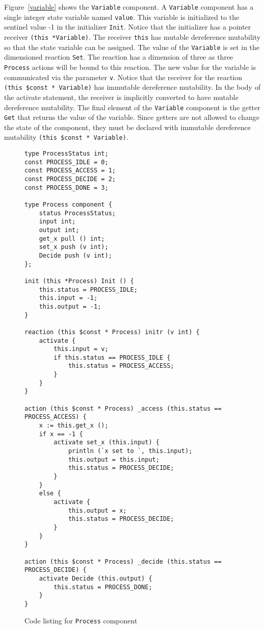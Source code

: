 Figure~\ref{variable} shows the \verb+Variable+ component.
A \verb+Variable+ component has a single integer state variable named \verb+value+.
This variable is initialized to the sentinel value -1 in the initializer \verb+Init+.
Notice that the initializer has a pointer receiver \verb+(this *Variable)+.
The receiver \verb+this+ has mutable dereference mutability so that the state variable can be assigned.
The value of the \verb+Variable+ is set in the dimensioned reaction \verb+Set+.
The reaction has a dimension of three as three \verb+Process+ actions will be bound to this reaction.
The new value for the variable is communicated via the parameter \verb+v+.
Notice that the receiver for the reaction \verb+(this $const * Variable)+ has immutable dereference mutability.
In the body of the activate statement, the receiver is implicitly converted to have mutable dereference mutability.
The final element of the \verb+Variable+ component is the getter \verb+Get+ that returns the value of the variable.
Since getters are not allowed to change the state of the component, they must be declared with immutable dereference mutability \verb+(this $const * Variable)+.

\begin{figure}
\begingroup
\fontsize{9pt}{11pt}\selectfont
\begin{verbatim}
type ProcessStatus int;
const PROCESS_IDLE = 0;
const PROCESS_ACCESS = 1;
const PROCESS_DECIDE = 2;
const PROCESS_DONE = 3;

type Process component {
    status ProcessStatus;
    input int;
    output int;
    get_x pull () int;
    set_x push (v int);
    Decide push (v int);
};

init (this *Process) Init () {
    this.status = PROCESS_IDLE;
    this.input = -1;
    this.output = -1;
}

reaction (this $const * Process) initr (v int) {
    activate {
        this.input = v;
        if this.status == PROCESS_IDLE {
            this.status = PROCESS_ACCESS;
        }
    }
}

action (this $const * Process) _access (this.status == PROCESS_ACCESS) {
    x := this.get_x ();
    if x == -1 {
        activate set_x (this.input) {
            println (`x set to `, this.input);
            this.output = this.input;
            this.status = PROCESS_DECIDE;
        }
    }
    else {
        activate {
            this.output = x;
            this.status = PROCESS_DECIDE;
        }
    }
}

action (this $const * Process) _decide (this.status == PROCESS_DECIDE) {
    activate Decide (this.output) {
        this.status = PROCESS_DONE;
    }
}
\end{verbatim}
\endgroup
\cprotect\caption{Code listing for \verb+Process+ component}
\label{process}
\end{figure}

